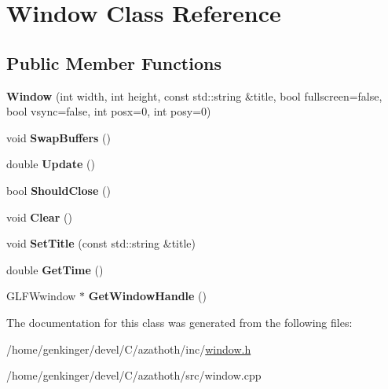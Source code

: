 \hypertarget{classWindow}{}\section{Window Class Reference}
\label{classWindow}
\subsection*{Public Member Functions}
\begin{DoxyCompactItemize}
\item 
\mbox{\label{classWindow_aed2cf14516a35d83ee43290e1b99b562}} 
{\bfseries Window} (int width, int height, const std\+::string \&title, bool fullscreen=false, bool vsync=false, int posx=0, int posy=0)
\item 
\mbox{\label{classWindow_abe1b83eda6980f2b9964aab08b5310ed}} 
void {\bfseries Swap\+Buffers} ()
\item 
\mbox{\label{classWindow_af6048cdfeabc5c2e2216e2e66ffaf4e9}} 
double {\bfseries Update} ()
\item 
\mbox{\label{classWindow_ad89997cacf4d57f2a28f291531e94b4f}} 
bool {\bfseries Should\+Close} ()
\item 
\mbox{\label{classWindow_a9904449165571eff36b106148ec1279f}} 
void {\bfseries Clear} ()
\item 
\mbox{\label{classWindow_a786ce3560240c525c443e984a50d9695}} 
void {\bfseries Set\+Title} (const std\+::string \&title)
\item 
\mbox{\label{classWindow_a5064bfa6c163ad8227c17c095f196d1f}} 
double {\bfseries Get\+Time} ()
\item 
\mbox{\label{classWindow_a1eb0ae686ca3a64ca67f10c11131581a}} 
G\+L\+F\+Wwindow $\ast$ {\bfseries Get\+Window\+Handle} ()
\end{DoxyCompactItemize}


The documentation for this class was generated from the following files\+:\begin{DoxyCompactItemize}
\item 
/home/genkinger/devel/\+C/azathoth/inc/\mbox{\hyperlink{window_8h}{window.\+h}}\item 
/home/genkinger/devel/\+C/azathoth/src/window.\+cpp\end{DoxyCompactItemize}
